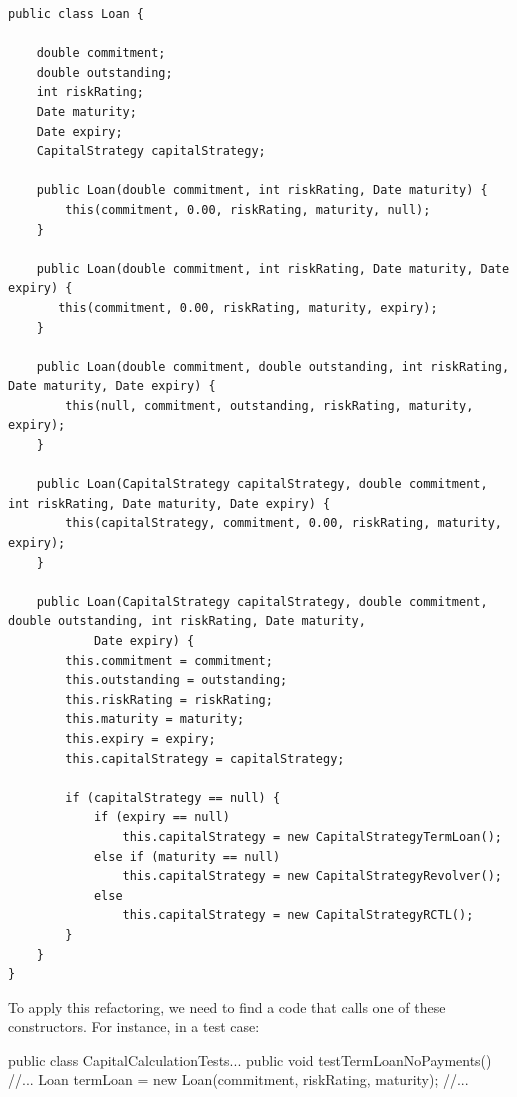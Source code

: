 \documentclass[a4paper,11pt]{memoir}
\newcommand{\code}[1]{{\texttt #1}}
\begin{document}
\begin{lstlisting}[caption={Cascade Constructors for class \code{Loan}},label=lst:load:constructors:bis,float=htbp]
public class Loan {

    double commitment;
    double outstanding;
    int riskRating;
    Date maturity;
    Date expiry;
    CapitalStrategy capitalStrategy;

    public Loan(double commitment, int riskRating, Date maturity) {
        this(commitment, 0.00, riskRating, maturity, null);
    }

    public Loan(double commitment, int riskRating, Date maturity, Date expiry) {
       this(commitment, 0.00, riskRating, maturity, expiry);
    }

    public Loan(double commitment, double outstanding, int riskRating, Date maturity, Date expiry) {
        this(null, commitment, outstanding, riskRating, maturity, expiry);
    }

    public Loan(CapitalStrategy capitalStrategy, double commitment, int riskRating, Date maturity, Date expiry) {
        this(capitalStrategy, commitment, 0.00, riskRating, maturity, expiry);
    }

    public Loan(CapitalStrategy capitalStrategy, double commitment, double outstanding, int riskRating, Date maturity,
            Date expiry) {
        this.commitment = commitment;
        this.outstanding = outstanding;
        this.riskRating = riskRating;
        this.maturity = maturity;
        this.expiry = expiry;
        this.capitalStrategy = capitalStrategy;

        if (capitalStrategy == null) {
            if (expiry == null)
                this.capitalStrategy = new CapitalStrategyTermLoan();
            else if (maturity == null)
                this.capitalStrategy = new CapitalStrategyRevolver();
            else
                this.capitalStrategy = new CapitalStrategyRCTL();
        }
    }
}
\end{lstlisting}


To apply this refactoring, we need to find a code that calls one of these constructors. For instance, in a test case:
\begin{java}
public class CapitalCalculationTests...
   public void testTermLoanNoPayments() {
      //...
      Loan termLoan = new Loan(commitment, riskRating, maturity);
      //...
   }
\end{java}
\end{document}
